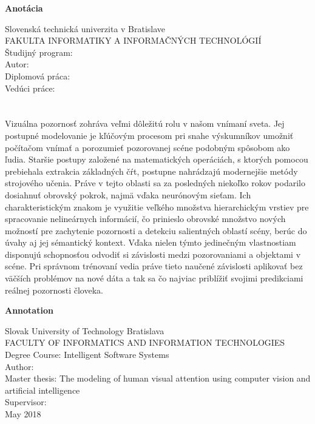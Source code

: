 \newpage
\cleardoublepage
\thispagestyle{plain}
\begin{center}
\begin{Large}
\textbf{Anotácia} \\
\end{Large}
\end{center}
Slovenská technická univerzita v Bratislave \\
FAKULTA INFORMATIKY A INFORMAČNÝCH TECHNOLÓGIÍ \\
\noindent
Študijný program: \Program \\
\noindent
Autor: \Author \\
{Diplomová práca: }\Title \\
Vedúci práce: \Supervisor \\
\Month\ \Year \\
\noindent
\\

Vizuálna pozornosť zohráva veľmi dôležitú rolu v našom vnímaní sveta. Jej postupné modelovanie je kľúčovým procesom pri snahe výskumníkov umožniť počítačom vnímať a porozumieť pozorovanej scéne podobným spôsobom ako ľudia. Staršie postupy založené na matematických operáciách, s ktorých pomocou prebiehala extrakcia základných čŕt, postupne nahrádzajú modernejšie metódy strojového učenia. Práve v tejto oblasti sa za posledných niekoľko rokov podarilo dosiahnuť obrovský pokrok, najmä vďaka neurónovým sieťam. Ich charakteristickým znakom je využitie veľkého množstva hierarchickým vrstiev pre spracovanie nelineárnych informácií, čo prinieslo obrovské množstvo nových možností pre zachytenie pozornosti a detekciu salientných oblastí scény, berúc do úvahy aj jej sémantický kontext. Vďaka nielen týmto jedinečným vlastnostiam disponujú schopnosťou odvodiť si závislosti medzi pozorovaniami a objektami v scéne. Pri správnom trénovaní vedia práve tieto naučené závislosti aplikovať bez väčších problémov na nové dáta a tak sa čo najviac priblížiť svojimi predikciami reálnej pozornosti človeka.

\newpage
\cleardoublepage
\thispagestyle{plain}
\begin{center}
\begin{Large}
\textbf{Annotation} \\
\end{Large}
\end{center}
Slovak University of Technology Bratislava \\
FACULTY OF INFORMATICS AND INFORMATION TECHNOLOGIES \\
\noindent
Degree Course: Intelligent Software Systems \\
\noindent
Author: \Author \\
{Master thesis: } The modeling of human visual attention using computer vision and artificial intelligence \\
Supervisor: \Supervisor \\
May 2018 \\
\noindent
\\


